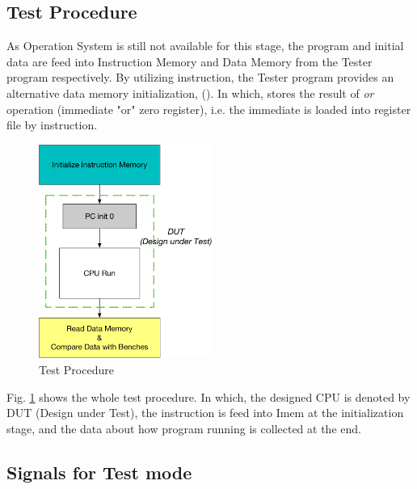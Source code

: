 \documentclass[a4paper]{article}
\begin{document}
\subsection{Test Procedure}\label{sub:TestProc}
As Operation System is still not available for this stage, the program and initial data are feed into Instruction Memory and Data Memory from the Tester program respectively. By utilizing  instruction, the Tester program provides an alternative data memory initialization,  (). In which,  stores the result of \textit{or} operation (immediate "or" zero register), i.e. the immediate is loaded into register file by  instruction.

\begin{figure}[ht]
 \centering
 \includegraphics[height=7cm]{images/l1TestProc.pdf}
 \caption{Test Procedure}
 \label{fig:testproc}
\end{figure}

Fig. \ref{fig:testproc} shows the whole test procedure. In which, the designed CPU is denoted by DUT (Design under Test), the instruction is feed into Imem at the initialization stage, and the data about how program running is collected at the end.

\subsection{Signals for Test mode}\label{sub:signal}
\end{document}
